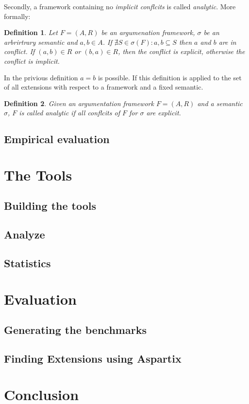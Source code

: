 \documentclass{scrartcl}
\newtheorem{definition}{Definition}
\begin{document}
Secondly, a framework containing no \emph{implicit conflcits} is called \emph{analytic}.
More formally:

\begin{definition}
  Let $F=(A,R)$ be an argumenation framework, $\sigma$ be an
  arbrirtrary semantic and $a, b\in A$. If $\nexists S \in \sigma(F): {a,b} \subseteq S$
  then $a$ and $b$ are in \emph{conflict}. If $(a,b) \in R$ or $(b, a)\in R$, then the
  conflict is \emph{explicit}, otherwise the conflict is \emph{implicit}.
\end{definition}

In the privious definition $a = b$ is possible. If this definition is applied to
the set of all extensions with respect to a framework and a fixed semantic.

\begin{definition}
Given an argumentation framework $F=(A,R)$ and a semantic $\sigma$, $F$ is called
\emph{analytic} if all conflcits of $F$ for $\sigma$ are explicit.
\end{definition}

\subsection{Empirical evaluation}

\section{The Tools}
\label{tools}
\subsection{Building the tools}
\subsection{Analyze}
\subsection{Statistics}

\section{Evaluation}
\label{evaluation}
\subsection{Generating the benchmarks}
\subsection{Finding Extensions using Aspartix}

\section{Conclusion}
\label{conclusion}

\printbibliography
\end{document}

